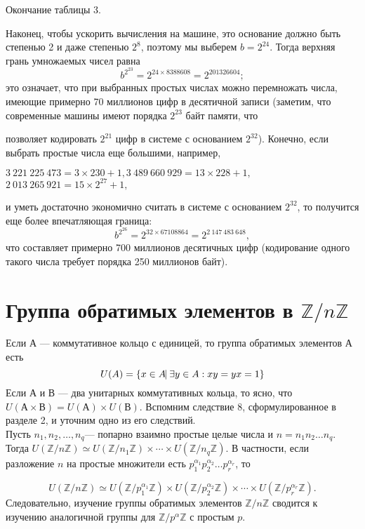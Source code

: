 \begin{center}
Окончание таблицы 3.
\end{center}
Наконец, чтобы ускорить вычисления на машине, это основание должно быть степенью 2 и даже степенью $2^{8}$, поэтому мы выберем $b = 2^{24}$. Тогда верхняя грань умножаемых чисел равна
$$b^{2^{23}} = 2^{24 \times 8388608} = 2^{201326604};$$
это означает, что при выбранных простых числах можно перемножать
числа, имеющие примерно 70 миллионов цифр в десятичной записи 
(заметим, что современные машины имеют порядка $2^{23}$ байт памяти, что
\pagebreak
\newpage

\noindent позволяет кодировать $2^{21}$ цифр в системе с основанием $2^{32}$). Конечно,
если выбрать простые числа еще большими, например,
\begin{center}
$3\ 221\ 225\ 473 = 3 \times 230 + 1, 3\ 489\ 660\ 929= 13 \times 228 + 1,$
$2\ 013\ 265\ 921 = 15\times2^{27} + 1,$
\end{center}
и уметь достаточно экономично считать в системе с основанием $2^{32}$,
то получится еще более впечатляющая граница:
$$b^{2^{26}} = 2^{32 \times 67108864} = 2^{2\ 147\ 483\ 648},$$
что составляет примерно 700 миллионов десятичных цифр 
(кодирование одного такого числа требует порядка 250 миллионов байт).
\vspace{10pt}


\sectiontop
\section{Группа обратимых элементов в $\mathbb{Z}/n\mathbb{Z}$}


\hspace{-14pt}Если А --- коммутативное кольцо с единицей, то группа обратимых
элементов А есть
$$U(A) = \{x \in A \vrule\ \exists y \in A:xy = yx = 1  \}$$
Если $А$ и $В$ — два унитарных коммутативных кольца, то ясно, что
$U(А \times В) = U(А) \times U(В)$. Вспомним следствие 8, сформулированное в
разделе 2, и уточним одно из его следствий. \\
Пусть $n_{1}, n_{2}, \ldots, n_{q}$--- попарно взаимно простые целые числа и $n = n_1n_2\ldots n_q$. Тогда $U(\mathbb{Z}/n\mathbb{Z})\simeq U(\mathbb{Z}/n_1\mathbb{Z})\times \cdots \times U(\mathbb{Z}/n_q\mathbb{Z})  $. В 
частности, если разложение $n$ на простые множители есть $p_1^{\alpha_1}p_2^{\alpha_2} \ldots p_r^{\alpha_r}$, то

$$U(\mathbb{Z}/n\mathbb{Z})\simeq U(\mathbb{Z}/p_1^{\alpha_1}\mathbb{Z})\times U(\mathbb{Z}/p_2^{\alpha_2}\mathbb{Z}) \times \cdots \times U(\mathbb{Z}/p_r^{\alpha_r}\mathbb{Z}).$$
Следовательно, изучение группы обратимых элементов $\mathbb{Z}/n\mathbb{Z}$ сводится к изучению аналогичной группы для $\mathbb{Z}/p^{\alpha}\mathbb{Z}$ с простым $p$. \\
\sectiontop

